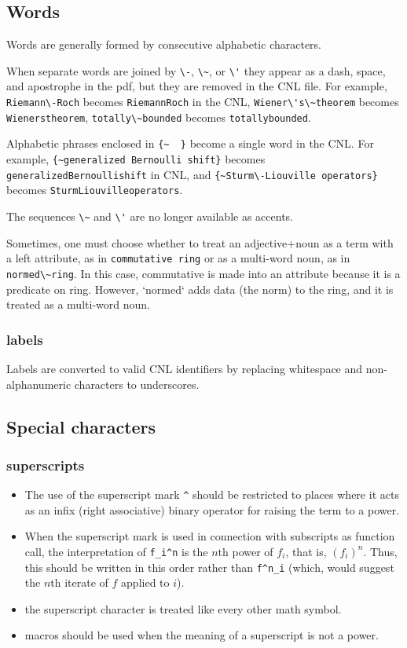 \documentclass[12pt]{amsart}
\begin{document}
\subsection{Words}

Words are generally formed by consecutive alphabetic characters.

When separate words are joined by \verb!\-!, \verb!\~!, or \verb!\'! they appear
as a dash, space, and apostrophe in the pdf, 
but they are removed in the CNL file.
For example, 
\verb!Riemann\-Roch! becomes \verb!RiemannRoch! in the CNL,
\verb!Wiener\'s\~theorem! becomes \verb!Wienerstheorem!,
\verb!totally\~bounded! becomes \verb!totallybounded!.

Alphabetic phrases enclosed in \verb!{~  }! become a single word in the CNL.
For example,
\verb!{~generalized Bernoulli shift}! becomes \verb!generalizedBernoullishift! in 
CNL, and
\verb!{~Sturm\-Liouville operators}! becomes \verb!SturmLiouvilleoperators!.

The sequences \verb!\~! and \verb!\'! are no longer available as accents.

Sometimes, one must choose whether to treat an adjective+noun as a
term with a left attribute, as in \verb!commutative ring! or as a
multi-word noun, as in \verb!normed\~ring!.  In this case, commutative
is made into an attribute because it is a predicate on ring. However,
`normed` adds data (the norm) to the ring, and it is treated as a
multi-word noun.



\subsubsection{labels}

Labels are converted to valid CNL identifiers by replacing
whitespace and non-alphanumeric characters to underscores.

\subsection{Special characters}

\subsubsection{superscripts}

\begin{itemize}
\item The use of the superscript mark \verb!^! should be restricted
to places where it acts as an infix (right associative) binary
operator for raising the term to a power.
\item When the superscript mark is used in connection with
subscripts as function call, the interpretation of \verb!f_i^n! is
the $n$th power of $f_i$, that is, $(f_i)^n$. 
Thus, this should be written in this
order rather than \verb!f^n_i! (which, would suggest the $n$th iterate
of $f$ applied to $i$).
\item the superscript character is treated like every other math symbol.
\item macros should be used when the meaning of a superscript is
not a power.
\end{itemize}
\end{document}
